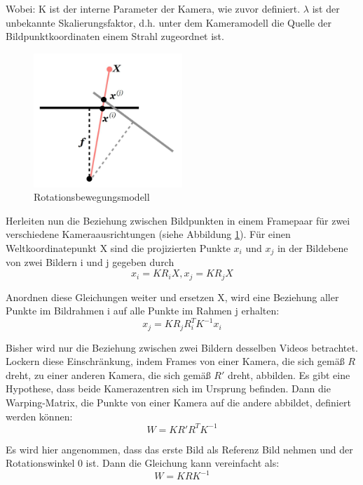 Wobei: K ist der interne Parameter der Kamera, wie zuvor definiert. $\lambda$ ist der unbekannte Skalierungsfaktor, d.h. unter dem Kameramodell die Quelle der Bildpunktkoordinaten einem Strahl zugeordnet ist.

\begin{figure}[H]
 \centering 
 \includegraphics[keepaspectratio,width=0.5\textwidth]{images/3_Ersteverfahren/Kamera/rotationsmodel.pdf}
 \caption{Rotationsbewegungsmodell}
 \label{fig:rotationsmodel}
\end{figure} 


Herleiten nun die Beziehung zwischen Bildpunkten in einem Framepaar für zwei verschiedene Kameraausrichtungen (siehe Abbildung \ref{fig:rotationsmodel}). Für einen Weltkoordinatepunkt X sind die projizierten Punkte $x_i$ und $x_j$ in der Bildebene von zwei Bildern i und j gegeben durch
\begin{equation}
   x_i = KR_iX, x_j = KR_jX
\end{equation}

Anordnen diese Gleichungen weiter und ersetzen X, wird eine Beziehung aller Punkte im Bildrahmen i auf alle Punkte im Rahmen j erhalten:
\begin{equation}
   x_j = KR_jR_i^TK^{-1}x_i
\end{equation}

Bisher wird nur die Beziehung zwischen zwei Bildern desselben Videos betrachtet. Lockern diese Einschränkung, indem Frames von einer Kamera, die sich gemäß $R$ dreht, zu einer anderen Kamera, die sich gemäß $R'$ dreht, abbilden. Es gibt eine Hypothese, dass beide Kamerazentren sich im Ursprung befinden. Dann die Warping-Matrix, die Punkte von einer Kamera auf die andere abbildet, definiert werden können:
\begin{equation}
   W = KR'R^TK^{-1}
\end{equation}

Es wird hier angenommen, dass das erste Bild als Referenz Bild nehmen und der Rotationswinkel 0 ist. Dann die Gleichung kann vereinfacht als:
\begin{equation}
   W = KRK^{-1}
\end{equation}

